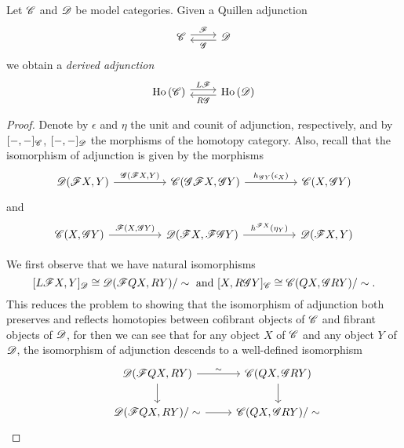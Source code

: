 \documentclass[10pt]{amsart}
\begin{document}
\begin{lem}
  Let $\mathscr{C}$ and $\mathscr{D}$ be model categories.
  Given a Quillen adjunction
  $$\begin{tikzcd}
    \C \arrow[shift left]{r}{\F} & \D \arrow[shift left]{l}{\G}
  \end{tikzcd}$$
  we obtain a {\it derived adjunction}
  $$\begin{tikzcd}
    \Ho{\C} \arrow[shift left]{r}{L\F} & \Ho{\D} \arrow[shift left]{l}{R\G}
  \end{tikzcd}$$

  \begin{proof}
    Denote by $\epsilon$ and $\eta$ the unit and counit of adjunction, respectively, and by $[-,-]_{\mathscr{C}}$, $[-,-]_{\mathscr{D}}$ the morphisms of the homotopy category.
    Also, recall that the isomorphism of adjunction is given by the morphisms
    $$\begin{tikzcd}
      \D(\F X, Y) \arrow{rr}{\G(\F X, Y)} && \C(\G \F X, \G Y) \arrow{rr}{h_{\G Y}(\epsilon_X)} && \C(X, \G Y) 
    \end{tikzcd}$$
    and
    $$\begin{tikzcd}
      \C(X, \G Y) \arrow{rr}{\F(X, \G Y)} && \D(\F X, \F \G Y) \arrow{rr}{h^{\F X}(\eta_Y)}&& \D(\F X, Y)
    \end{tikzcd}$$
    
    We first observe that we have natural isomorphisms
    $$[L\F X, Y]_\D \cong \D(\F Q X, R Y)/\sim\ \text{and}\ 
    [X, R\G Y]_\C \cong \C(Q X, \G R Y)/\sim.$$
    This reduces the problem to showing that the isomorphism of adjunction both preserves and reflects homotopies between cofibrant objects of $\mathscr{C}$ and fibrant objects of $\mathscr{D}$, for then we can see that for any object $X$ of $\mathscr{C}$ and any object $Y$ of $\mathscr{D}$, the isomorphism of adjunction descends to a well-defined isomorphism
    $$\begin{tikzcd}
      & \D(\F Q X, R Y) \arrow{r}{\sim}\arrow{d} & \C(Q X, \G R Y)\arrow{d}\\
      & \D(\F Q X, RY)/\sim \arrow{r} & \C(QX, \G R Y)/\sim
    \end{tikzcd}$$
    

\end{proof}
\end{lem}
\end{document}
